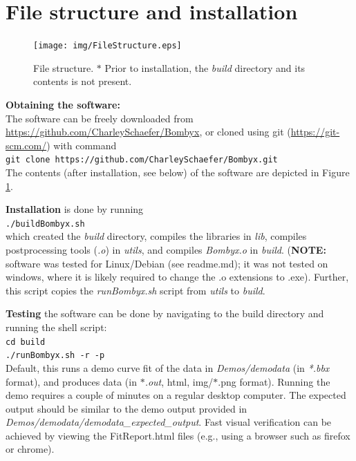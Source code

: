 \documentclass[  superscriptaddress]{revtex4}
\begin{document}
\section{File structure and installation }



\begin{figure}[h]
  \centering
  \texttt{[image: img/FileStructure.eps]}
  \caption{File structure. $\ast$ Prior to installation, the \emph{build} directory and its contents is not present.  }
  \label{fig:FileStructure}
\end{figure}

\textbf{Obtaining the software:} \\
The software can be freely downloaded from \url{https://github.com/CharleySchaefer/Bombyx}, or cloned using git (\url{https://git-scm.com/}) with command\\
\texttt{git clone https://github.com/CharleySchaefer/Bombyx.git}\\
The contents (after installation, see below) of the software are depicted in Figure \ref{fig:FileStructure}.


\textbf{Installation} is done by running\\
\texttt{./buildBombyx.sh}\\
which created the \emph{build} directory, compiles the libraries in \emph{lib}, compiles postprocessing tools (\emph{.o}) in \emph{utils}, and compiles \emph{Bombyx.o} in \emph{build}.
(\textbf{NOTE:} software was tested for Linux/Debian (see readme.md); it was not tested on windows, where it is likely required to change the .o extensions  to .exe).
Further, this script copies the \emph{runBombyx.sh} script from \emph{utils} to \emph{build}.

\textbf{Testing} the software can be done by navigating to the build directory and running the shell script:\\
\texttt{cd build}\\
\texttt{./runBombyx.sh -r -p}\\
Default, this runs a demo curve fit of the data in \emph{Demos/demodata} (in \emph{*.bbx} format), and produces data (in \emph{$\ast$.out}, html, img/$\ast$.png format).
Running the demo requires a couple of minutes on a regular desktop computer.
The expected output should be similar to the demo output provided in \emph{Demos/demodata/demodata\_expected\_output}. Fast visual verification can be achieved by viewing the FitReport.html files (e.g., using a browser such as firefox or chrome).  
\end{document}
